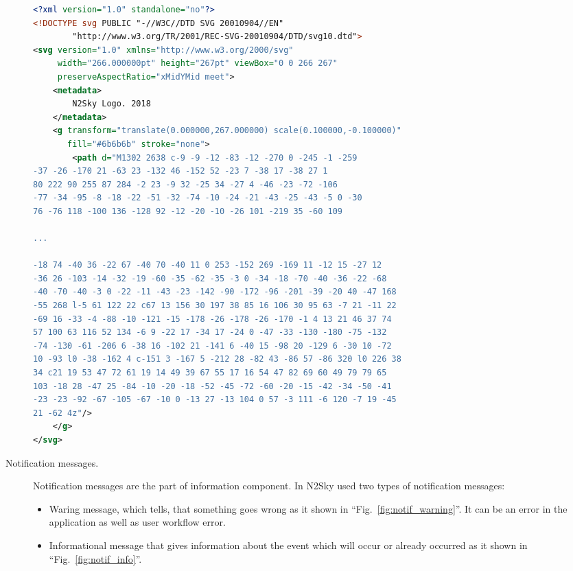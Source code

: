 \begin{description}
\begin{lstlisting}[language=XML, caption=SVG example]
<?xml version="1.0" standalone="no"?>
<!DOCTYPE svg PUBLIC "-//W3C//DTD SVG 20010904//EN"
        "http://www.w3.org/TR/2001/REC-SVG-20010904/DTD/svg10.dtd">
<svg version="1.0" xmlns="http://www.w3.org/2000/svg"
     width="266.000000pt" height="267pt" viewBox="0 0 266 267"
     preserveAspectRatio="xMidYMid meet">
    <metadata>
        N2Sky Logo. 2018
    </metadata>
    <g transform="translate(0.000000,267.000000) scale(0.100000,-0.100000)"
       fill="#6b6b6b" stroke="none">
        <path d="M1302 2638 c-9 -9 -12 -83 -12 -270 0 -245 -1 -259
-37 -26 -170 21 -63 23 -132 46 -152 52 -23 7 -38 17 -38 27 1
80 222 90 255 87 284 -2 23 -9 32 -25 34 -27 4 -46 -23 -72 -106 
-77 -34 -95 -8 -18 -22 -51 -32 -74 -10 -24 -21 -43 -25 -43 -5 0 -30 
76 -76 118 -100 136 -128 92 -12 -20 -10 -26 101 -219 35 -60 109 

...

-18 74 -40 36 -22 67 -40 70 -40 11 0 253 -152 269 -169 11 -12 15 -27 12 
-36 26 -103 -14 -32 -19 -60 -35 -62 -35 -3 0 -34 -18 -70 -40 -36 -22 -68
-40 -70 -40 -3 0 -22 -11 -43 -23 -142 -90 -172 -96 -201 -39 -20 40 -47 168
-55 268 l-5 61 122 22 c67 13 156 30 197 38 85 16 106 30 95 63 -7 21 -11 22
-69 16 -33 -4 -88 -10 -121 -15 -178 -26 -178 -26 -170 -1 4 13 21 46 37 74
57 100 63 116 52 134 -6 9 -22 17 -34 17 -24 0 -47 -33 -130 -180 -75 -132
-74 -130 -61 -206 6 -38 16 -102 21 -141 6 -40 15 -98 20 -129 6 -30 10 -72
10 -93 l0 -38 -162 4 c-151 3 -167 5 -212 28 -82 43 -86 57 -86 320 l0 226 38
34 c21 19 53 47 72 61 19 14 49 39 67 55 17 16 54 47 82 69 60 49 79 79 65
103 -18 28 -47 25 -84 -10 -20 -18 -52 -45 -72 -60 -20 -15 -42 -34 -50 -41
-23 -23 -92 -67 -105 -67 -10 0 -13 27 -13 104 0 57 -3 111 -6 120 -7 19 -45
21 -62 4z"/>
    </g>
</svg>
\end{lstlisting}

\item[Notification messages.] Notification messages are the part of information component. In N2Sky used two types of notification messages: 
\begin{itemize}
\item Waring message, which tells, that something goes wrong as it shown in ``Fig.~\ref{fig:notif_warning}''. It can be an error in the application as well as user workflow error. 
\item Informational message that gives information about the event which will occur or already occurred as it shown in ``Fig.~\ref{fig:notif_info}''.
\end{itemize}



\end{description}
